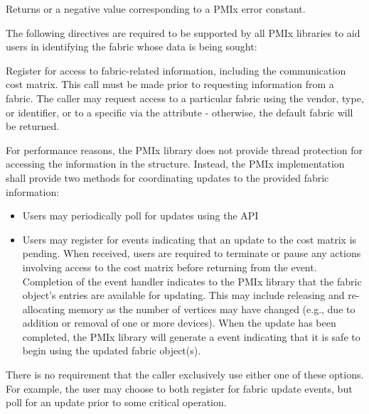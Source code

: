 Returns  or a negative value corresponding to a \ac{PMIx} error constant.

\reqattrstart
The following directives are required to be supported by all \ac{PMIx} libraries to aid users in identifying the fabric whose data is being sought:


\reqattrend

\descr

Register for access to fabric-related information, including the communication cost matrix. This call must be made prior to requesting information from a fabric. The caller may request access to a particular fabric using the vendor, type, or identifier, or to a specific  via the  attribute - otherwise, the default fabric will be returned.

For performance reasons, the \ac{PMIx} library does not provide thread protection for accessing the information in the  structure. Instead, the \ac{PMIx} implementation shall provide two methods for coordinating updates to the provided fabric information:

\begin{itemize}

    \item Users may periodically poll for updates using the  \ac{API}

    \item Users may register for  events indicating that an update to the cost matrix is pending. When received, users are required to terminate or pause any actions involving access to the cost matrix before returning from the event. Completion of the  event handler indicates to the \ac{PMIx} library that the fabric object's entries are available for updating. This may include releasing and re-allocating memory as the number of vertices may have changed (e.g., due to addition or removal of one or more devices). When the update has been completed, the \ac{PMIx} library will generate a  event indicating that it is safe to begin using the updated fabric object(s).

\end{itemize}

There is no requirement that the caller exclusively use either one of these options. For example, the user may choose to both register for fabric update events, but poll for an update prior to some critical operation.

